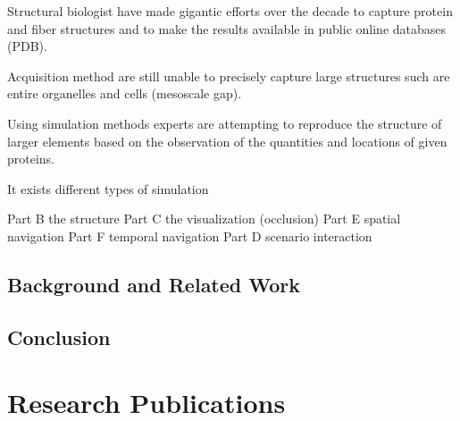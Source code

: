 Structural biologist have made gigantic efforts over the decade to capture protein and fiber structures and to make the results available in public online databases (PDB).


Acquisition method are still unable to precisely capture large structures such are entire organelles and cells (mesoscale gap).

Using simulation methods experts are attempting to reproduce the structure of larger elements based on the observation of the quantities and locations of given proteins.













 

It exists different types of simulation 


Part B the structure
Part C the visualization (occlusion)
Part E spatial navigation 
Part F temporal navigation 
Part D scenario interaction 



\section{Background and Related Work}



\section{Conclusion}

\chapter{Research Publications}


